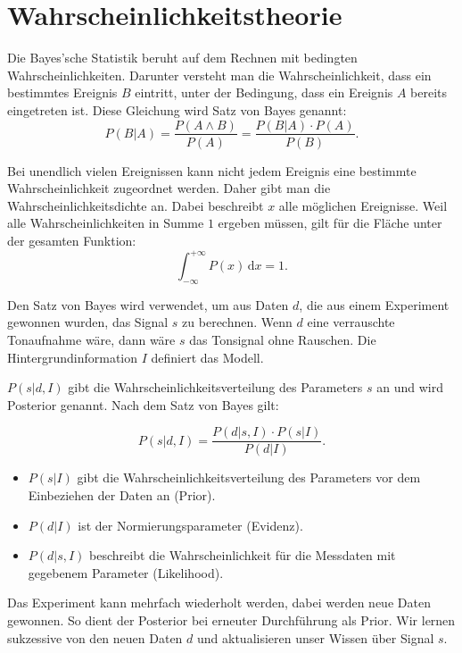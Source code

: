 \section{Wahrscheinlichkeitstheorie}\label{k4.2.bayes}

Die Bayes'sche Statistik beruht auf dem Rechnen mit bedingten Wahrscheinlichkeiten. Darunter versteht man die Wahrscheinlichkeit, dass ein bestimmtes Ereignis $B$ eintritt, unter der Bedingung, dass ein Ereignis $A$ bereits eingetreten ist. Diese Gleichung wird Satz von Bayes genannt:
\begin{equation}
P(B|A) = \frac{P(A \wedge B)}{P(A)} = \frac{P(B|A)\cdot P(A)}{P(B)}.
\end{equation}

Bei unendlich vielen Ereignissen kann nicht jedem Ereignis eine bestimmte Wahrscheinlichkeit zugeordnet werden. Daher gibt man die Wahrscheinlichkeitsdichte an. Dabei beschreibt $x$ alle möglichen Ereignisse. Weil alle Wahrscheinlichkeiten in Summe $1$ ergeben müssen, gilt für die Fläche unter der gesamten Funktion:
\begin{equation}
\int_{- \infty }^ {+ \infty} P(x) \,\mbox{d}x = 1.
\end{equation}

Den Satz von Bayes wird verwendet, um aus Daten $d$, die aus einem Experiment gewonnen wurden, das Signal $s$ zu berechnen. Wenn $d$ eine verrauschte Tonaufnahme wäre, dann wäre $s$ das Tonsignal ohne Rauschen. Die Hintergrundinformation $I$ definiert das Modell. 


 
 $P(s|d,I)$ gibt die Wahrscheinlichkeitsverteilung des Parameters $s$ an und wird Posterior genannt. Nach dem Satz von Bayes gilt:
 
\begin{equation}
P(s|d,I) = \frac{P(d|s,I)\cdot P(s|I)}{P(d|I)}.
\end{equation}

\begin{itemize}
 \item $P(s|I)$ gibt die Wahrscheinlichkeitsverteilung des Parameters vor dem Einbeziehen der Daten an (Prior).
 \item $P(d|I)$ ist der Normierungsparameter (Evidenz).
 \item $P(d|s,I)$ beschreibt die Wahrscheinlichkeit für die Messdaten mit gegebenem Parameter (Likelihood).
\end{itemize}

Das Experiment kann mehrfach wiederholt werden, dabei werden neue Daten gewonnen. So dient der Posterior bei erneuter Durchführung als Prior. Wir lernen sukzessive von den neuen Daten $d$ und aktualisieren unser Wissen über Signal $s$.